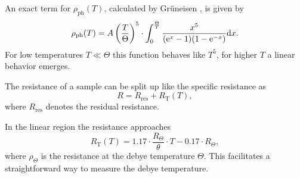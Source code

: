 An exact term for $\rho_\text{ph}(T)$, calculated by Grüneisen \cite{elresistancemetal}, is given by
\begin{equation}
	\rho_\text{ph}(T) = A \left(\frac{T}{\Theta}\right)^5 \cdot \int_0^\frac{\Theta}{T}\frac{x^5}{(\text{e}^x - 1)(1 - \text{e}^{-x})} \text{d} x.
\end{equation}
For low temperatures $T \ll \Theta$ this function behaves like $T^5$, for higher $T$ a linear behavior emerges.

The resistance of a sample can be split up like the specific resistance as
\begin{equation*}
	R = R_\text{res} + R_\text{T}(T),
\end{equation*}
where $R_\text{res}$ denotes the residual resistance.

In the linear region the resistance approaches \cite{elresistancemetal}
\begin{equation}
	R_\text{T}(T) = \num{1.17} \cdot \frac{R_\Theta}{\theta} \cdot T - \num{0.17} \cdot R_\Theta,
\end{equation}
where $\rho_\Theta$ is the resistance at the debye temperature $\Theta$.
This facilitates a straightforward way to measure the debye temperature.
